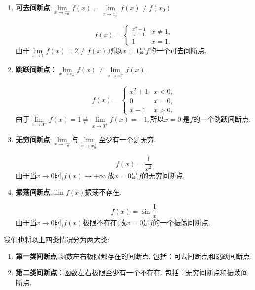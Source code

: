 \begin{enumerate}
	\item \textbf{可去间断点}:$\lim\limits_{x\to x_0^{-}}f(x)=\lim\limits_{x\to x_0^{+}}f(x)\ne f(x_0)$
	      \begin{example}
		      \[
			      f(x) =
			      \begin{cases}
				      \frac{x^{2}-1}{x-1} & x \ne 1 , \\
				      1                   & x =1 .
			      \end{cases}
		      \]
		      由于$\lim\limits_{x\to 1}f(x)=2\ne f(x)$,所以$x=1$是$f$的一个可去间断点.
	      \end{example}

	\item \textbf{跳跃间断点}：$\lim\limits_{x\to x_0^{-}}f(x)\ne \lim\limits_{x\to x_0^{+}}f(x)$.
	      \begin{example}
		      \[
			      f(x) =
			      \begin{cases}
				      x^2+1 & x <0,  \\
				      0     & x =0 , \\
				      x-1   & x>0.
			      \end{cases}
		      \]
		      由于$\lim\limits_{x\to 0^-}f(x)=1\ne\lim\limits_{x\to 0^+}f(x)=-1,$所以$x=0$ 是$f$的一个跳跃间断点.
	      \end{example}

	\item \textbf{无穷间断点}:$\lim\limits_{x\to x_0^{-}}$与$\lim\limits_{x\to x_0^{+}}$至少有一个是无穷.
	      \begin{example}
		      \[
			      f(x)=\frac{1}{x^2}
		      \]
		      由于当$x\to 0$时,$f(x)\to +\infty$,故$x=0$是$f$的无穷间断点.
	      \end{example}

	\item \textbf{振荡间断点}:$\lim f(x)$振荡不存在.
	      \begin{example}
		      \[
			      f(x)=\sin\frac{1}{x}
		      \]
		      由于当$x\to 0$时,$f(x)$极限不存在,故$x=0$是$f$的一个振荡间断点.
	      \end{example}
\end{enumerate}

我们也将以上四类情况分为两大类:
\begin{enumerate}
	\item \textbf{第一类间断点}:函数左右极限都存在的间断点.
	      包括：可去间断点和跳跃间断点.
	\item \textbf{第二类间断点}：函数左右极限至少有一个不存在.
	      包括：无穷间断点和振荡间断点.
\end{enumerate}

